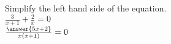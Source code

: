 \documentclass{ximera}
\author{David Kish}
\begin{document}
\begin{exercise}
Simplify the left hand side of the equation.\\
$\frac{3}{x+1} + \frac{2}{x}=0$\\
$\frac{\answer{5x+2}}{x(x+1)}=0$
\end{exercise}
\end{document}
